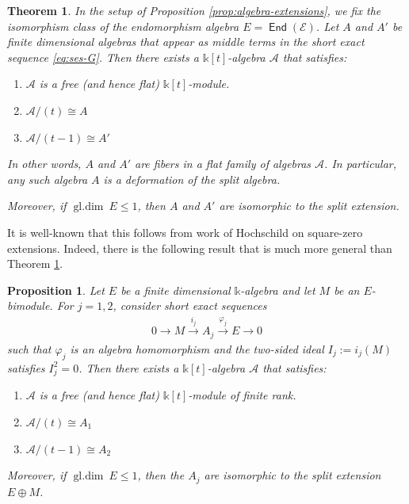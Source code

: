 \documentclass[a4paper,11pt, reqno]{amsart}
\def\sE{\mathscr{E}}
\def\gldim{{\operatorname{gl.dim}\ }}
\newcommand{\opname}[1]{\operatorname{\mathsf{#1}}}
\newcommand{\End}{\opname{End}}
\theoremstyle{plain}
\newtheorem{theorem}[dummy]{Theorem}
\newtheorem{proposition}[dummy]{Proposition}
\theoremstyle{definition}
\numberwithin{equation}{section}
\newlength{\arrow}
\begin{document}
\begin{theorem}\label{T:Deformations} In the setup of Proposition \ref{prop:algebra-extensions}, we fix the isomorphism class of the endomorphism algebra $E=\End(\sE)$.
    Let $A$ and $A'$ be finite dimensional algebras that appear as middle terms in the short exact sequence \eqref{eq:ses-G}. Then there exists a $\mathbb{k}[t]$-algebra $\mathcal{A}$ that satisfies:
    \begin{enumerate}[label=(\alph*)]
        \item $\mathcal{A}$ is a free (and hence flat) $\mathbb{k}[t]$-module.
        \item $\mathcal{A}/(t) \cong A$
        \item $\mathcal{A}/(t-1) \cong A'$
    \end{enumerate}
    In other words, $A$ and $A'$ are fibers in a flat family of algebras $\mathcal{A}$. In particular, any such algebra $A$ is a deformation of the split algebra.

    Moreover, if $\gldim E \leq 1$, then $A$ and $A'$ are isomorphic to the split extension. 
\end{theorem}

It is well-known that this follows from work of Hochschild \cite{Hochschild} on square-zero extensions. Indeed, there is the following result that is much more general than Theorem \ref{T:Deformations}.

\begin{proposition}\label{P:DeformGeneral}
    Let $E$ be a finite dimensional $\mathbb{k}$-algebra and let $M$ be an $E$-bimodule.
    For $j=1, 2$, consider short exact sequences
    \begin{align}\label{eq:squarezeroextension}
        0 \to M \xrightarrow{i_j} A_j \xrightarrow{\varphi_j} E \to 0
    \end{align}
    such that $\varphi_j$ is an algebra homomorphism and the two-sided ideal $I_j:=i_j(M)$ satisfies $I_j^2=0$. Then there exists a $\mathbb{k}[t]$-algebra $\mathcal{A}$ that satisfies:
    \begin{enumerate}[label=(\alph*)]
        \item $\mathcal{A}$ is a free (and hence flat) $\mathbb{k}[t]$-module of finite rank.
        \item $\mathcal{A}/(t) \cong A_1$
        \item $\mathcal{A}/(t-1) \cong A_2$
    \end{enumerate} 
    Moreover, if $\gldim E \leq 1$, then the $A_j$ are isomorphic to the split extension $E \oplus M$.
\end{proposition}
\end{document}
